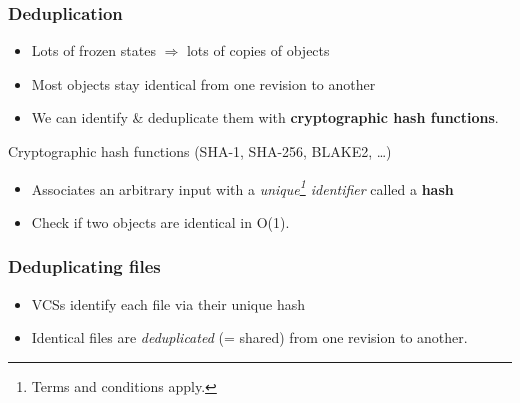 \documentclass[aspectratio=169,xcolor=table]{beamer}
\begin{document}
    \begin{frame}
        \frametitle{Deduplication}
        \begin{block}{}
            \begin{itemize}
                \item Lots of frozen states $\Rightarrow$ lots of copies of
                    objects
                \item Most objects stay identical from one revision to another
                \pause
                \item We can identify \& deduplicate them with
                    \textbf{cryptographic hash functions}.
            \end{itemize}
        \end{block}
        \vfill
        \begin{figure}
            \centering
            \scalebox{0.8}{}
        \end{figure}
        \begin{block}{Cryptographic hash functions (SHA-1, SHA-256, BLAKE2, …)}
            \begin{itemize}
                \item Associates an arbitrary input with a
                    \emph{unique\footnote{Terms and conditions apply.}
                    identifier} called a \textbf{hash}
                \item Check if two objects are identical in O(1).
            \end{itemize}
        \end{block}
    \end{frame}

    \begin{frame}
        \frametitle{Deduplicating files}
        \begin{block}{}
            \begin{itemize}
                \item VCSs identify each file via their unique hash
                \item Identical files are \emph{deduplicated} (= shared) from
                    one revision to another.
            \end{itemize}
        \end{block}
        \vfill
        \begin{figure}
            \centering
            \scalebox{0.8}{}
        \end{figure}
    \end{frame}
\end{document}
